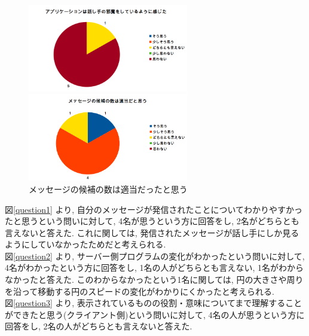 \documentclass{funthesis}
\begin{document}
  \begin{figure}[H]
 \begin{minipage}{0.5\hsize}
  \begin{center}
  \includegraphics[width=70mm]{./img/question7.png}
  \end{center}
  \caption{アプリケーションは話し手の邪魔\newline をしているように感じた}
  \label{question7}
 \end{minipage}
 \begin{minipage}{0.5\hsize}
  \begin{center}
  \includegraphics[width=70mm]{./img/question8.png}
  \end{center}
  \caption{メッセージの候補の数は適当だったと思う}
  \label{question8}
  \end{minipage}
  \end{figure}

図\ref{question1} より, 自分のメッセージが発信されたことについてわかりやすかったと思うという問いに対して, 4名が思うという方に回答をし, 2名がどちらとも言えないと答えた. これに関しては, 発信されたメッセージが話し手にしか見るようにしていなかったためだと考えられる. \\

図\ref{question2} より, サーバー側プログラムの変化がわかったという問いに対して, 4名がわかったという方に回答をし, 1名の人がどちらとも言えない, 1名がわからなかったと答えた. このわからなかったという1名に関しては, 円の大きさや周りを沿って移動する円のスピードの変化がわかりにくかったと考えられる. \\ 

図\ref{question3} より, 表示されているものの役割・意味についてまで理解することができたと思う(クライアント側)という問いに対して, 4名の人が思うという方に回答をし, 2名の人がどちらとも言えないと答えた. \\
\end{document}

